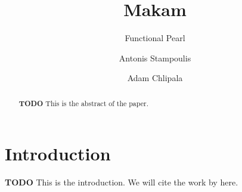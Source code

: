 \documentclass[format=acmlarge,review,anonymous]{acmart}\settopmatter{printfolios=true}
\begin{document}
\title{Makam}
\subtitle{Functional Pearl}

\author{Antonis Stampoulis}

\author{Adam Chlipala}

\newcommand\TODO[0]{\textbf{TODO}}
\newcommand\lamprolog[0]{$\lambda$Prolog\xspace}
\newenvironment{codequote}{\begin{quote}\begin{alltt}}{\end{alltt}\end{quote}}

\begin{abstract}
\TODO{} This is the abstract of the paper.
\end{abstract}



\maketitle



\section{Introduction}

\TODO{} This is the introduction. We will cite the work by \citet{miller1988overview} here.
\end{document}
